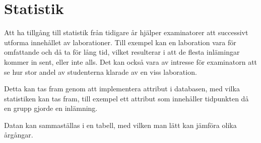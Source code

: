 \section{Statistik}

Att ha tillgång till statistik från tidigare år hjälper examinatorer att successivt utforma innehållet av laborationer. Till exempel kan en laboration vara för omfattande och då ta för lång tid, vilket resulterar i att de flesta inlämingar kommer in sent, eller inte alls. Det kan också vara av intresse för examinatorn att se hur stor andel av studenterna klarade av en viss laboration.  

Detta kan tas fram genom att implementera attribut i databasen, med vilka statistiken kan tas fram, till exempel ett attribut som innehåller tidpunkten då en grupp gjorde en inlämning.

Datan kan sammaställas i en tabell, med vilken man lätt kan jämföra olika årgångar.
